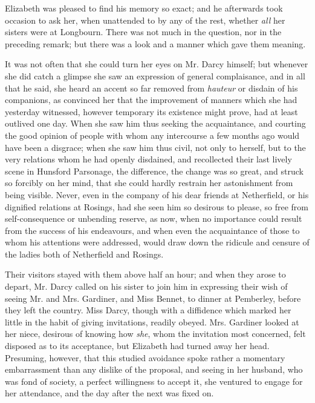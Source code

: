\documentclass[12pt,openright]{book}
\begin{document}
Elizabeth was pleased to find his memory so exact; and he afterwards took occasion to ask her, when unattended to by any of the rest, whether \textit{all} her sisters were at Longbourn. There was not much in the question, nor in the preceding remark; but there was a look and a manner which gave them meaning.

It was not often that she could turn her eyes on Mr. Darcy himself; but whenever she did catch a glimpse she saw an expression of general complaisance, and in all that he said, she heard an accent so far removed from \textit{hauteur} or disdain of his companions, as convinced her that the improvement of manners which she had yesterday witnessed, however temporary its existence might prove, had at least outlived one day. When she saw him thus seeking the acquaintance, and courting the good opinion of people with whom any intercourse a few months ago would have been a disgrace; when she saw him thus civil, not only to herself, but to the very relations whom he had openly disdained, and recollected their last lively scene in Hunsford Parsonage, the difference, the change was so great, and struck so forcibly on her mind, that she could hardly restrain her astonishment from being visible. Never, even in the company of his dear friends at Netherfield, or his dignified relations at Rosings, had she seen him so desirous to please, so free from self-consequence or unbending reserve, as now, when no importance could result from the success of his endeavours, and when even the acquaintance of those to whom his attentions were addressed, would draw down the ridicule and censure of the ladies both of Netherfield and Rosings.

Their visitors stayed with them above half an hour; and when they arose to depart, Mr. Darcy called on his sister to join him in expressing their wish of seeing Mr. and Mrs. Gardiner, and Miss Bennet, to dinner at Pemberley, before they left the country. Miss Darcy, though with a diffidence which marked her little in the habit of giving invitations, readily obeyed. Mrs. Gardiner looked at her niece, desirous of knowing how \textit{she}, whom the invitation most concerned, felt disposed as to its acceptance, but Elizabeth had turned away her head. Presuming, however, that this studied avoidance spoke rather a momentary embarrassment than any dislike of the proposal, and seeing in her husband, who was fond of society, a perfect willingness to accept it, she ventured to engage for her attendance, and the day after the next was fixed on.
\end{document}
